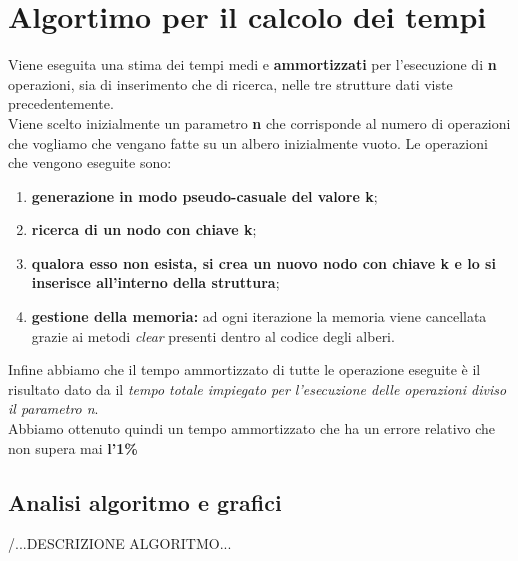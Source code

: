 \documentclass[a4paper]{article}
\begin{document}
		\section{Algortimo per il calcolo dei tempi}
		Viene eseguita una stima dei tempi medi e \textbf{ammortizzati} per l'esecuzione di \textbf{n} operazioni, sia di inserimento che di ricerca, nelle tre strutture dati viste precedentemente. \\
		Viene scelto inizialmente un parametro \textbf{n} che corrisponde al numero di operazioni che vogliamo che vengano fatte su un albero inizialmente vuoto. Le operazioni che vengono eseguite sono:
		\begin{enumerate}
			\item \textbf{generazione in modo pseudo-casuale del valore k};
			\item \textbf{ricerca di un nodo con chiave k};
			\item \textbf{qualora esso non esista, si crea un nuovo nodo con chiave k e lo si inserisce all'interno della struttura};
			\item \textbf{gestione della memoria:} ad ogni iterazione la memoria viene cancellata grazie ai metodi \textit{clear} presenti dentro al codice degli alberi.
		\end{enumerate}
		Infine abbiamo che il tempo ammortizzato di tutte le operazione eseguite è il risultato dato da il \textit{tempo totale impiegato per l'esecuzione delle operazioni diviso il parametro n}.\\
		Abbiamo ottenuto quindi un tempo ammortizzato che ha un errore relativo che non supera mai 
		\textbf{l'1\%}
		
		\subsection{Analisi algoritmo e grafici}
		/...DESCRIZIONE ALGORITMO...\
		
\end{document}
